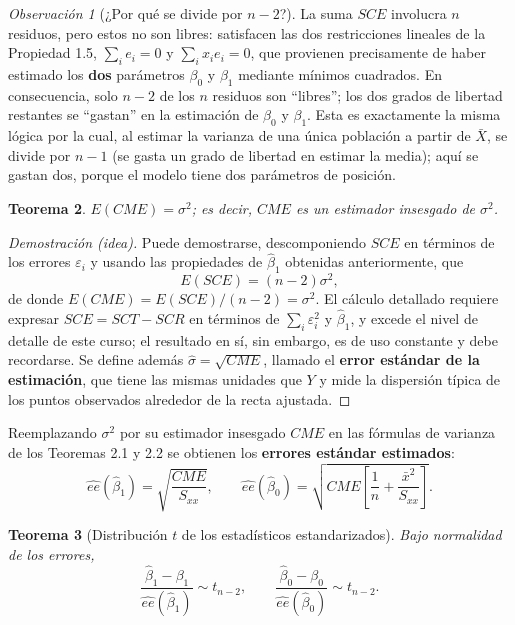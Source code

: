 \documentclass[11pt,a4paper]{article}
\theoremstyle{plain}
\newtheorem{teorema}{Teorema}[section]
\theoremstyle{definition}
\theoremstyle{remark}
\newtheorem{observacion}[teorema]{Observación}
\begin{document}
\begin{observacion}[¿Por qué se divide por $n-2$?]
La suma $SCE$ involucra $n$ residuos, pero estos no son libres: satisfacen las dos restricciones lineales de la Propiedad 1.5, $\sum_ie_i=0$ y $\sum_ix_ie_i=0$, que provienen precisamente de haber estimado los \textbf{dos} parámetros $\beta_0$ y $\beta_1$ mediante mínimos cuadrados. En consecuencia, solo $n-2$ de los $n$ residuos son ``libres''; los dos grados de libertad restantes se ``gastan'' en la estimación de $\beta_0$ y $\beta_1$. Esta es exactamente la misma lógica por la cual, al estimar la varianza de una única población a partir de $\bar X$, se divide por $n-1$ (se gasta un grado de libertad en estimar la media); aquí se gastan dos, porque el modelo tiene dos parámetros de posición.
\end{observacion}

\begin{teorema}
$E(CME)=\sigma^2$; es decir, $CME$ es un estimador insesgado de $\sigma^2$.
\end{teorema}

\begin{proof}[Demostración (idea)]
Puede demostrarse, descomponiendo $SCE$ en términos de los errores $\varepsilon_i$ y usando las propiedades de $\hat\beta_1$ obtenidas anteriormente, que
\[
E(SCE) = (n-2)\sigma^2,
\]
de donde $E(CME)=E(SCE)/(n-2)=\sigma^2$. El cálculo detallado requiere expresar $SCE=SCT-SCR$ en términos de $\sum_i\varepsilon_i^2$ y $\hat\beta_1$, y excede el nivel de detalle de este curso; el resultado en sí, sin embargo, es de uso constante y debe recordarse. Se define además $\hat\sigma=\sqrt{CME}$, llamado el \textbf{error estándar de la estimación}, que tiene las mismas unidades que $Y$ y mide la dispersión típica de los puntos observados alrededor de la recta ajustada.
\end{proof}

Reemplazando $\sigma^2$ por su estimador insesgado $CME$ en las fórmulas de varianza de los Teoremas 2.1 y 2.2 se obtienen los \textbf{errores estándar estimados}:
\[
\widehat{ee}(\hat\beta_1) = \sqrt{\frac{CME}{S_{xx}}}, \qquad \widehat{ee}(\hat\beta_0) = \sqrt{CME\left[\frac1n+\frac{\bar x^2}{S_{xx}}\right]}.
\]

\begin{teorema}[Distribución $t$ de los estadísticos estandarizados]
Bajo normalidad de los errores,
\[
\frac{\hat\beta_1-\beta_1}{\widehat{ee}(\hat\beta_1)} \sim t_{n-2}, \qquad \frac{\hat\beta_0-\beta_0}{\widehat{ee}(\hat\beta_0)} \sim t_{n-2}.
\]
\end{teorema}
\end{document}
